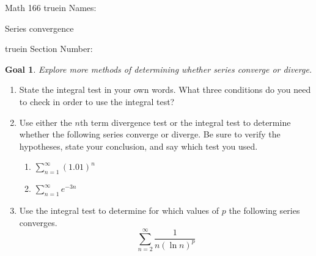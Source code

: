 \documentclass[12pt]{article}
\newtheorem*{goal}{Goal}
\begin{document}
\pagestyle{empty} %

\noindent
{Math 166 
  truein  Names:\ \hrulefill}

\noindent
{Series convergence}

\noindent  {} truein  Section Number:\ \hrulefill
\medskip

\begin{goal} \rm
Explore more methods of determining whether series converge or diverge. 
\end{goal}

\begin{enumerate}
\item State the integral test in your own words. What three conditions do you need to check in order to use the integral test?


\vspace{.7in}
\item Use either the $n$th term divergence test or the integral test to determine whether the following series converge or diverge. Be sure to verify the hypotheses, state your conclusion, and say which test you used. 
\begin{enumerate}
\item $\displaystyle\sum_{n=1}^{\infty} (1.01)^n$

\vspace{2.5in}

\item $\displaystyle\sum_{n=1}^{\infty} e^{-3n}$


\end{enumerate} 
\newpage
\item Use the integral test to determine for which values of $p$ the following series converges.
\[
\sum_{n = 2}^\infty \frac{1}{n (\ln n)^p}
\]
\vfill


\end{enumerate}
\end{document}
